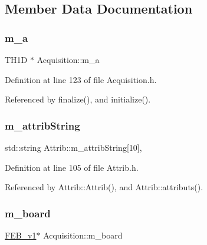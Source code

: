 \subsection{Member Data Documentation}
\mbox{\label{classAcquisition_aedfd2a4842b08fdf85176bf672030430}} 
\subsubsection{\texorpdfstring{m\+\_\+a}{m\_a}}
{\footnotesize\ttfamily T\+H1D $\ast$ Acquisition\+::m\+\_\+a\hspace{0.3cm}{\ttfamily [private]}}



Definition at line 123 of file Acquisition.\+h.



Referenced by finalize(), and initialize().

\mbox{\label{classAttrib_a3414521d7a82476e874b25a5407b5e63}} 
\subsubsection{\texorpdfstring{m\+\_\+attrib\+String}{m\_attribString}}
{\footnotesize\ttfamily std\+::string Attrib\+::m\+\_\+attrib\+String\mbox{[}10\mbox{]}\hspace{0.3cm}{\ttfamily [protected]}, {\ttfamily [inherited]}}



Definition at line 105 of file Attrib.\+h.



Referenced by Attrib\+::\+Attrib(), and Attrib\+::attributs().

\mbox{\label{classAcquisition_ad4820003ddd62f0ca886c2e6a3690120}} 
\subsubsection{\texorpdfstring{m\+\_\+board}{m\_board}\hspace{0.1cm}{\footnotesize\ttfamily [1/2]}}
{\footnotesize\ttfamily \hyperlink{classFEB__v1}{F\+E\+B\+\_\+v1}$\ast$ Acquisition\+::m\+\_\+board\hspace{0.3cm}{\ttfamily [private]}}



